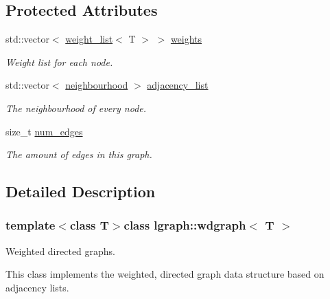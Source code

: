 \subsection*{Protected Attributes}
\begin{DoxyCompactItemize}
\item 
std\-::vector$<$ \hyperlink{namespacelgraph_a1e0fd5ef0a78b2a92da48adbed265cb6}{weight\-\_\-list}$<$ T $>$ $>$ \hyperlink{classlgraph_1_1wxgraph_a6f8c983edc82913c2d78b7bc871defe8}{weights}
\begin{DoxyCompactList}\small\item\em Weight list for each node. \end{DoxyCompactList}\item 
\hypertarget{classlgraph_1_1xxgraph_a31cf82d0b20be05290be259dc97a51ec}{std\-::vector$<$ \hyperlink{namespacelgraph_a052e7766c13f3a43cec0aec8173fdede}{neighbourhood} $>$ \hyperlink{classlgraph_1_1xxgraph_a31cf82d0b20be05290be259dc97a51ec}{adjacency\-\_\-list}}\label{classlgraph_1_1xxgraph_a31cf82d0b20be05290be259dc97a51ec}

\begin{DoxyCompactList}\small\item\em The neighbourhood of every node. \end{DoxyCompactList}\item 
\hypertarget{classlgraph_1_1xxgraph_a6765a9a3be42f6e0f824635c593b35d7}{size\-\_\-t \hyperlink{classlgraph_1_1xxgraph_a6765a9a3be42f6e0f824635c593b35d7}{num\-\_\-edges}}\label{classlgraph_1_1xxgraph_a6765a9a3be42f6e0f824635c593b35d7}

\begin{DoxyCompactList}\small\item\em The amount of edges in this graph. \end{DoxyCompactList}\end{DoxyCompactItemize}


\subsection{Detailed Description}
\subsubsection*{template$<$class T$>$class lgraph\-::wdgraph$<$ T $>$}

Weighted directed graphs. 

This class implements the weighted, directed graph data structure based on adjacency lists.



